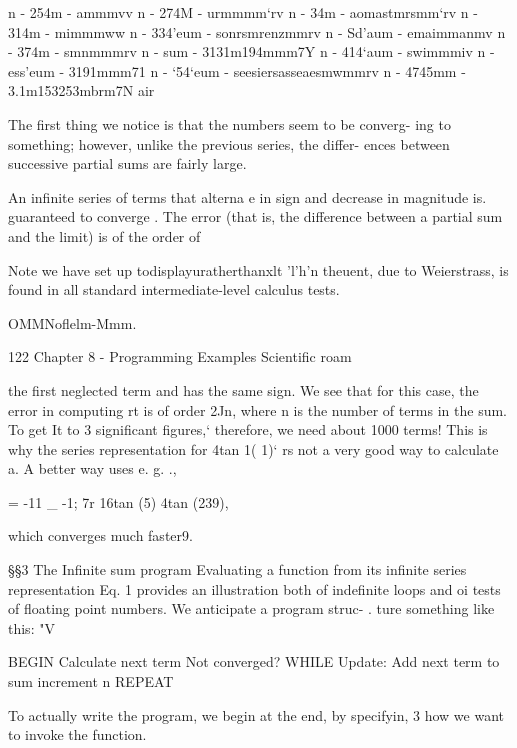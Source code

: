 n - 254m - ammmvv
n - 274M - urmmmm‘rv
n - 34m - aomastmrsmm‘rv
n - 314m - mimmmww
n - 334'eum - sonrsmrenzmmrv
n - Sd'aum - emaimmanmv
n - 374m - smnmmmrv
n - sum - 3131m194mmm7Y
n - 414‘aum - swimmmiv
n - ess'eum - 3191mmm71
n - ‘54‘eum - seesiersasseaesmwmmrv
n - 4745mm - 3.1m153253mbrm7N air

The ﬁrst thing we notice is that the numbers seem to be converg-
ing to something; however, unlike the previous series, the differ-
ences between successive partial sums are fairly large.

An inﬁnite series of terms that alterna e in sign and decrease in
magnitude is. guaranteed to converge . The error (that is, the
difference between a partial sum and the limit) is of the order of

 

Note we have set up todisplayuratherthanxlt
'l'h'n theuent, due to Weierstrass, is found in all standard intermediate-level calculus tests.

OMMNoﬂelm-Mmm.

122 Chapter 8 - Programming Examples Scientiﬁc roam

the first neglected term and has the same sign. We see that for
this case, the error in computing rt is of order 2Jn, where n is the
number of terms in the sum. To get It to 3 signiﬁcant ﬁgures,‘
therefore, we need about 1000 terms! This is why the series
representation for 4tan 1( 1)‘ rs not a very good way to calculate a.
A better way uses e. g. .,

= -11 _ -1;
7r 16tan (5) 4tan (239),

which converges much faster9.

§§3 The Infinite sum program
Evaluating a function from its inﬁnite series representation
Eq. 1 provides an illustration both of indeﬁnite loops and oi
tests of ﬂoating point numbers. We anticipate a program struc- .
ture something like this: "V

 

BEGIN
Calculate next term
Not converged?
WHILE
Update:
Add next term to sum
increment n
REPEAT

To actually write the program, we begin at the end, by specifyin, 3
how we want to invoke the function.


